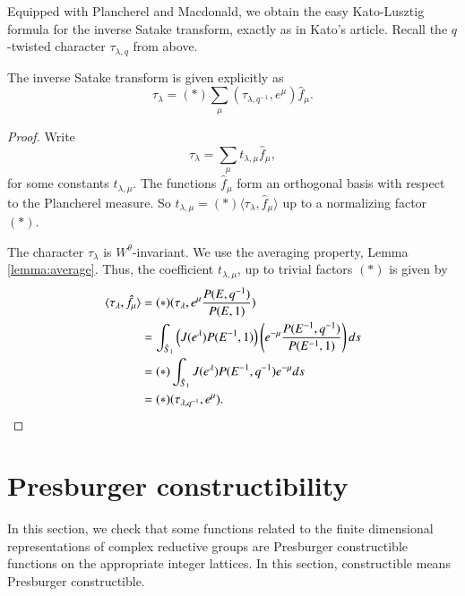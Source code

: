 Equipped with Plancherel and Macdonald, we obtain the easy Kato-Lusztig formula for the inverse Satake transform, 
exactly as in Kato's article.   Recall the $q$-twisted character  $\tau_{\lambda,q}$ from above.

\begin{theorem}
The inverse Satake transform is given explicitly as
\[
\tau_\lambda = (*)\sum_\mu (\tau_{\lambda,q^{-1}},e^\mu)  \hat f_\mu.
\]
\end{theorem}

\begin{proof}
Write 
\[
\tau_\lambda = \sum_\mu t_{\lambda,\mu}  \hat f_\mu,
\]
for some constants $t_{\lambda,\mu}$.
The functions $\hat f_\mu$ form an orthogonal basis with respect to the Plancherel measure.
So $t_{\lambda,\mu} = (*) \langle\tau_\lambda,\hat f_\mu\rangle$ up to a normalizing factor $(*)$.

The character $\tau_\lambda$ is $W^\theta$-invariant. 
We use the averaging property, Lemma \ref{lemma:average}.
Thus, the coefficient $t_{\lambda,\mu}$, up to trivial factors $(*)$ is given by
\begin{align*}
\langle{\tau_\lambda,\hat f_\mu}\rangle
&=(*)(\tau_\lambda,e^\mu \frac{P(E,q^{-1})}{P(E,1)})\\
&=\int_{\hat S_1} \left(J(e^\lambda) P(E^{-1},1)\right) \left( e^{-\mu}\frac{P(E^{-1},q^{-1})}{P(E^{-1},1)} \right) ds\\
&=
(*)\int_{\hat S_1} J(e^\lambda) P(E^{-1},q^{-1}) e^{-\mu} ds\\
&=(*)(\tau_{\lambda,q^{-1}},e^\mu).
\end{align*}
\end{proof}



\section{Presburger constructibility}

In this section,
we check that some functions related to the finite dimensional representations of complex reductive groups
are Presburger constructible functions on the appropriate integer lattices.  In this section, constructible means Presburger
constructible.

